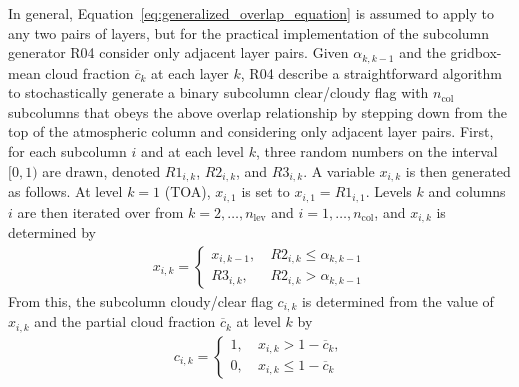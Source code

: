 In general, Equation~\ref{eq:generalized_overlap_equation} is assumed to
apply to any two pairs of layers, but for the practical implementation
of the subcolumn generator R04 consider only adjacent layer pairs. Given
\(\alpha_{k, k-1}\) and the gridbox-mean cloud fraction
\(\overline{c}_{k}\) at each layer \(k\), R04 describe a straightforward
algorithm to stochastically generate a binary subcolumn clear/cloudy
flag with \(n_\textrm{col}\) subcolumns that obeys the above overlap
relationship by stepping down from the top of the atmospheric column and
considering only adjacent layer pairs. First, for each subcolumn \(i\)
and at each level \(k\), three random numbers on the interval \([0, 1)\)
are drawn, denoted \(R1_{i, k}\), \(R2_{i, k}\), and \(R3_{i, k}\). A
variable \(x_{i, k}\) is then generated as follows. At level \(k = 1\)
(TOA), \(x_{i, 1}\) is set to \(x_{i, 1} = R1_{i, 1}\). Levels \(k\) and
columns \(i\) are then iterated over from
\(k = 2, \ldots, n_\textrm{lev}\) and \(i = 1, \ldots, n_\textrm{col}\),
and \(x_{i, k}\) is determined by \[\begin{gathered} 
    x_{i, k} = \begin{cases} 
        x_{i, k-1}, ~ & R2_{i, k} \le \alpha_{k, k-1} \\ 
        R3_{i, k}, ~ & R2_{i, k} > \alpha_{k, k-1}
    \end{cases}
\end{gathered}\] From this, the subcolumn cloudy/clear flag \(c_{i,k}\)
is determined from the value of \(x_{i, k}\) and the partial cloud
fraction \(\overline{c}_{k}\) at level \(k\) by \[\begin{gathered} 
    c_{i, k} = \begin{cases} 
        1, ~ & x_{i, k} > 1 - \overline{c}_{k}, \\ 
        0, ~ & x_{i, k} \le 1 - \overline{c}_{k} 
    \end{cases}
\end{gathered}\]

